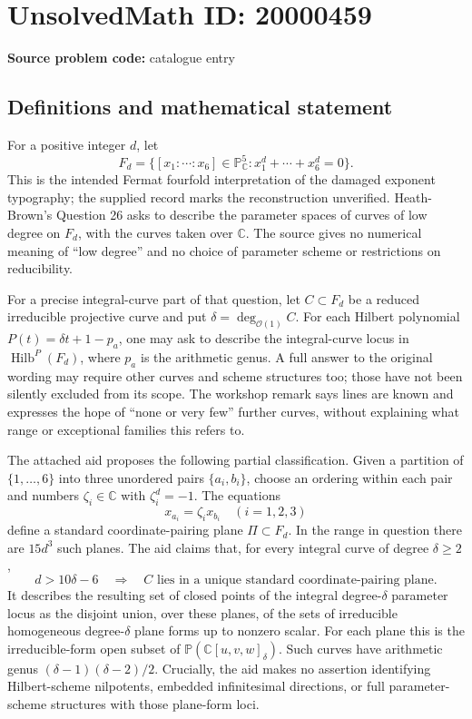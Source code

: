 \documentclass[11pt]{article}
\newcommand{\C}{\mathbb{C}}
\newcommand{\PP}{\mathbb{P}}
\begin{document}
\section*{UnsolvedMath ID: 20000459}
\textbf{Source problem code:} catalogue entry
\subsection{Definitions and mathematical statement}
For a positive integer \(d\), let
\[
F_d=\{[x_1:\cdots:x_6]\in\PP^5_\C:x_1^d+\cdots+x_6^d=0\}.
\]
This is the intended Fermat fourfold interpretation of the damaged exponent typography; the supplied record marks the reconstruction unverified. Heath-Brown's Question 26 asks to describe the parameter spaces of curves of low degree on \(F_d\), with the curves taken over \(\C\). The source gives no numerical meaning of ``low degree'' and no choice of parameter scheme or restrictions on reducibility.

For a precise integral-curve part of that question, let \(C\subset F_d\) be a reduced irreducible projective curve and put \(\delta=\deg_{\mathcal O(1)}C\). For each Hilbert polynomial \(P(t)=\delta t+1-p_a\), one may ask to describe the integral-curve locus in \(\operatorname{Hilb}^{P}(F_d)\), where \(p_a\) is the arithmetic genus. A full answer to the original wording may require other curves and scheme structures too; those have not been silently excluded from its scope. The workshop remark says lines are known and expresses the hope of ``none or very few'' further curves, without explaining what range or exceptional families this refers to.

The attached aid proposes the following partial classification. Given a partition of \(\{1,\ldots,6\}\) into three unordered pairs \(\{a_i,b_i\}\), choose an ordering within each pair and numbers \(\zeta_i\in\C\) with \(\zeta_i^d=-1\). The equations
\[
x_{a_i}=\zeta_i x_{b_i}\quad(i=1,2,3)
\]
define a standard coordinate-pairing plane \(\Pi\subset F_d\). In the range in question there are \(15d^3\) such planes. The aid claims that, for every integral curve of degree \(\delta\geq2\),
\[
d>10\delta-6\quad\Longrightarrow\quad
C\text{ lies in a unique standard coordinate-pairing plane}.
\]
It describes the resulting set of closed points of the integral degree-\(\delta\) parameter locus as the disjoint union, over these planes, of the sets of irreducible homogeneous degree-\(\delta\) plane forms up to nonzero scalar. For each plane this is the irreducible-form open subset of
\(\PP(\C[u,v,w]_\delta)\). Such curves have arithmetic genus \((\delta-1)(\delta-2)/2\). Crucially, the aid makes no assertion identifying Hilbert-scheme nilpotents, embedded infinitesimal directions, or full parameter-scheme structures with those plane-form loci.
\end{document}
